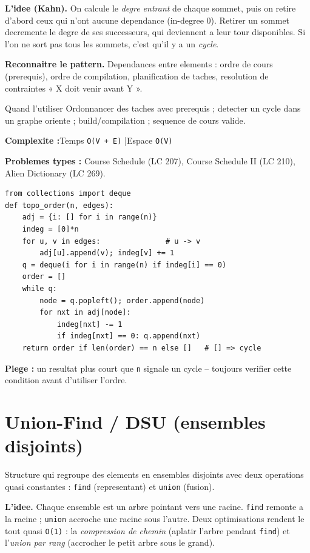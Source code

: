 \documentclass[11pt,a4paper]{article}
\newcommand{\complexite}[2]{%
  \noindent\textbf{Complexite :}\quad Temps \texttt{#1} \quad|\quad Espace \texttt{#2}\par\smallskip}
\newcommand{\leetcode}[1]{\noindent\textbf{Problemes types :} #1\par\medskip}
\begin{document}
\textbf{L'idee (Kahn).} On calcule le \emph{degre entrant} de chaque sommet, puis
on retire d'abord ceux qui n'ont aucune dependance (in-degree 0). Retirer un
sommet decremente le degre de ses successeurs, qui deviennent a leur tour
disponibles. Si l'on ne sort pas tous les sommets, c'est qu'il y a un \emph{cycle}.

\textbf{Reconnaitre le pattern.} Dependances entre elements : ordre de cours
(prerequis), ordre de compilation, planification de taches, resolution de
contraintes « X doit venir avant Y ».

\begin{infobox}{Quand l'utiliser}
Ordonnancer des taches avec prerequis ; detecter un cycle dans un graphe oriente ;
build/compilation ; sequence de cours valide.
\end{infobox}

\complexite{O(V + E)}{O(V)}
\leetcode{Course Schedule (LC 207), Course Schedule II (LC 210), Alien Dictionary (LC 269).}

\begin{lstlisting}
from collections import deque
def topo_order(n, edges):
    adj = {i: [] for i in range(n)}
    indeg = [0]*n
    for u, v in edges:               # u -> v
        adj[u].append(v); indeg[v] += 1
    q = deque(i for i in range(n) if indeg[i] == 0)
    order = []
    while q:
        node = q.popleft(); order.append(node)
        for nxt in adj[node]:
            indeg[nxt] -= 1
            if indeg[nxt] == 0: q.append(nxt)
    return order if len(order) == n else []   # [] => cycle
\end{lstlisting}

\textbf{Piege :} un resultat plus court que \texttt{n} signale un cycle -- toujours
verifier cette condition avant d'utiliser l'ordre.

\section{Union-Find / DSU (ensembles disjoints)}
Structure qui regroupe des elements en ensembles disjoints avec deux operations
quasi constantes : \texttt{find} (representant) et \texttt{union} (fusion).

\textbf{L'idee.} Chaque ensemble est un arbre pointant vers une racine. \texttt{find}
remonte a la racine ; \texttt{union} accroche une racine sous l'autre. Deux
optimisations rendent le tout quasi \texttt{O(1)} : la \emph{compression de chemin}
(aplatir l'arbre pendant \texttt{find}) et l'\emph{union par rang} (accrocher le
petit arbre sous le grand).
\end{document}
